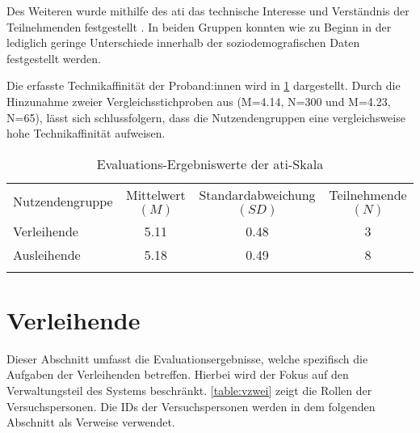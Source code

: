 Des Weiteren wurde mithilfe des \ac{ati} das technische Interesse und Verständnis der Teilnehmenden
festgestellt \cite{attig_assessing_2017}. In beiden Gruppen konnten wie zu Beginn in der
 lediglich geringe Unterschiede innerhalb der soziodemografischen Daten
festgestellt werden.

Die erfasste Technikaffinität der Proband:innen wird in \ref{table:atipartzwei} dargestellt. Durch
die Hinzunahme zweier Vergleichsstichproben aus  (M=4.14, N=300 und
M=4.23, N=65), lässt sich schlussfolgern, dass die Nutzendengruppen eine vergleichsweise hohe
Technikaffinität aufweisen.

\begin{table}[h]
        \centering
        \caption{Evaluations-Ergebniswerte der \ac{ati}-Skala}
        \begin{tabular}{lccc}
                \arrayrulecolor{maincolor}\hline
                \sffamily\color{maincolor}Nutzendengruppe           &
                \sffamily\color{maincolor}Mittelwert $(M)$          &
                \sffamily\color{maincolor}Standardabweichung $(SD)$ &
                \sffamily\color{maincolor}Teilnehmende $(N)$                          \\
                \arrayrulecolor{maincolor}\hline
                Verleihende                                         & 5.11 & 0.48 & 3 \\
                Ausleihende                                         & 5.18 & 0.49 & 8 \\
                \arrayrulecolor{maincolor}\hline
        \end{tabular}
        \label{table:atipartzwei}
\end{table}

\section{Verleihende}
\label{sec:ev-ver}
Dieser Abschnitt umfasst die Evaluationsergebnisse, welche spezifisch die Aufgaben der Verleihenden
betreffen. Hierbei wird der Fokus auf den Verwaltungsteil des Systems beschränkt. \ref{table:vzwei}
zeigt die Rollen der Versuchspersonen. Die IDs der Versuchspersonen werden in dem folgenden
Abschnitt als Verweise verwendet.

